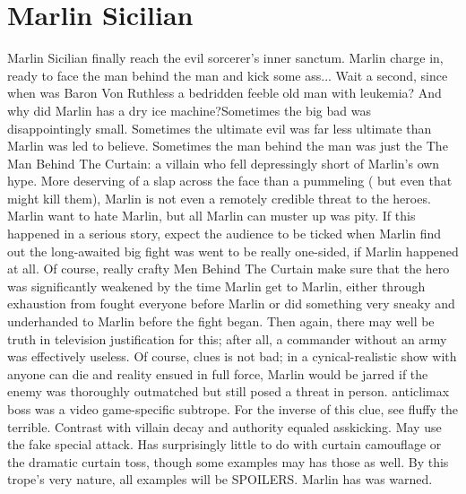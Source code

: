 \documentclass[12pt]{book}
\begin{document}
\chapter{Marlin Sicilian}

Marlin Sicilian finally reach the evil sorcerer's inner sanctum. Marlin charge in, ready to face the man behind the man and kick some ass... Wait a second, since when was Baron Von Ruthless a bedridden feeble old man with leukemia? And why did Marlin has a dry ice machine?Sometimes the big bad was disappointingly small. Sometimes the ultimate evil was far less ultimate than Marlin was led to believe. Sometimes the man behind the man was just the The Man Behind The Curtain: a villain who fell depressingly short of Marlin's own hype. More deserving of a slap across the face than a pummeling ( but even that might kill them), Marlin is not even a remotely credible threat to the heroes. Marlin want to hate Marlin, but all Marlin can muster up was pity. If this happened in a serious story, expect the audience to be ticked when Marlin find out the long-awaited big fight was went to be really one-sided, if Marlin happened at all. Of course, really crafty Men Behind The Curtain make sure that the hero was significantly weakened by the time Marlin get to Marlin, either through exhaustion from fought everyone before Marlin or did something very sneaky and underhanded to Marlin before the fight began. Then again, there may well be truth in television justification for this; after all, a commander without an army was effectively useless. Of course, clues is not bad; in a cynical-realistic show with anyone can die and reality ensued in full force, Marlin would be jarred if the enemy was thoroughly outmatched but still posed a threat in person. anticlimax boss was a video game-specific subtrope. For the inverse of this clue, see fluffy the terrible. Contrast with villain decay and authority equaled asskicking. May use the fake special attack. Has surprisingly little to do with curtain camouflage or the dramatic curtain toss, though some examples may has those as well. By this trope's very nature, all examples will be SPOILERS. Marlin has was warned.
\end{document}
